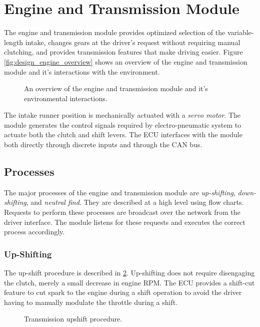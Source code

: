\section{Engine and Transmission Module}

The engine and transmission module provides optimized selection of the variable-length intake, changes gears at the driver's request without requiring manual clutching, and provides transmission features that make driving easier. Figure \ref{fig:design_engine_overview} shows an overview of the engine and transmission module and it's interactions with the environment.

\begin{figure}[H]
	\centering
	
	\caption{An overview of the engine and transmission module and it's environmental interactions.}
	\label{fig:design_engine_overview_block}
\end{figure}

The intake runner position is mechanically actuated with a \emph{servo motor}. The module generates the control signals required by electro-pneumatic system to actuate both the clutch and shift levers. The ECU interfaces with the module both directly through discrete inputs and through the CAN bus.

\subsection{Processes}

The major processes of the engine and transmission module are \emph{up-shifting}, \emph{down-shifting}, and \emph{neutral find}. They are described at a high level using flow charts. Requests to perform these processes are broadcast over the network from the driver interface. The module listens for these requests and executes the correct process accordingly.

\subsubsection{Up-Shifting}

The up-shift procedure is described in \ref{fig:transmission_upshift_flow}. Up-shifting does not require disengaging the clutch, merely a small decrease in engine RPM. The ECU provides a shift-cut feature to cut spark to the engine during a shift operation to avoid the driver having to manually modulate the throttle during a shift.

\begin{figure}[H]
	\centering
	
	\caption{Transmission upshift procedure.}
	\label{fig:transmission_upshift_flow}
\end{figure}

